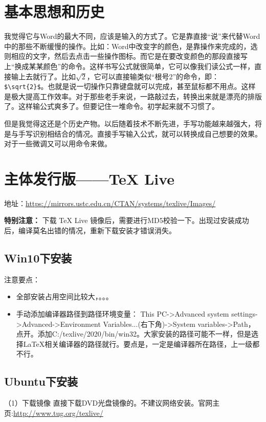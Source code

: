 \section{基本思想和历史}
我觉得它与Word的最大不同，应该是输入的方式了。它是靠直接“说”来代替Word中的那些不断缓慢的操作。比如：Word中改变字的颜色，是靠操作来完成的，选则相应的文字，然后去点击一些操作图标。而它是在要改变颜色的那段直接写上“换成某某颜色”的命令。这样书写公式就很简单，它可以像我们读公式一样，直接输上去就行了。比如$\sqrt{2}$，它可以直接输类似“根号2”的命令，即：\verb|$\sqrt{2}$|。也就是说一切操作只靠键盘就可以完成，甚至鼠标都不用点。这样是极大提高工作效率。对于那些老手来说，一路敲过去，转换出来就是漂亮的排版了。这样输公式爽多了。但要记住一堆命令。初学起来就不习惯了。

但是我觉得这还是个历史产物。以后随着技术不断先进，手写功能越来越强大，将是与手写识别相结合的情况。直接手写输入公式，就可以转换成自己想要的效果。对于一些微调又可以用命令来做。




\section{主体发行版——\TeX{} Live }
地址：\url{https://mirrors.ustc.edu.cn/CTAN/systems/texlive/Images/}

\textbf{特别注意：} 下载 \TeX{} Live 镜像后，需要进行MD5校验一下。出现过安装成功后，编译莫名出错的情况，重新下载安装才错误消失。


\subsection{Win10下安装}
注意要点：
\begin{itemize}
\item 全部安装占用空间比较大，。。。
\item 手动添加编译器路径到路径环境变量：
This PC->Advanced system settings->Advanced->Environment Variables...(右下角)->System variables->Path，点开。添加C:/texlive/2020/bin/win32。大家安装的路径可能不一样，但是选择\LaTeX{}相关编译器的路径就行。要点是，一定是编译器所在路径，上一级都不行。
\end{itemize}



\subsection{Ubuntu下安装}
（1）下载镜像
直接下载DVD光盘镜像的。不建议网络安装。官网主页:\url{http://www.tug.org/texlive/}


